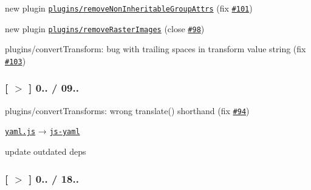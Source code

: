 \begin{DoxyItemize}
\item new plugin \href{https://github.com/svg/svgo/blob/master/plugins/removeNonInheritableGroupAttrs.js}{\tt plugins/remove\+Non\+Inheritable\+Group\+Attrs} (fix \href{https://github.com/svg/svgo/issues/101}{\tt \#101})
\item new plugin \href{https://github.com/svg/svgo/blob/master/plugins/removeRasterImages.js}{\tt plugins/remove\+Raster\+Images} (close \href{https://github.com/svg/svgo/issues/98}{\tt \#98})
\item plugins/convert\+Transform\+: bug with trailing spaces in transform value string (fix \href{https://github.com/svg/svgo/issues/103}{\tt \#103})
\end{DoxyItemize}

\subsubsection*{\mbox{[} \href{https://github.com/svg/svgo/tree/v0.2.2}{\tt $>$} \mbox{]} 0.. / 09..}


\begin{DoxyItemize}
\item plugins/convert\+Transforms\+: wrong translate() shorthand (fix \href{https://github.com/svg/svgo/issues/94}{\tt \#94})
\item \href{https://github.com/jeremyfa/yaml.js}{\tt yaml.\+js} → \href{https://github.com/nodeca/js-yaml}{\tt js-\/yaml}
\item update outdated deps
\end{DoxyItemize}

\subsubsection*{\mbox{[} \href{https://github.com/svg/svgo/tree/v0.2.1}{\tt $>$} \mbox{]} 0.. / 18..}


